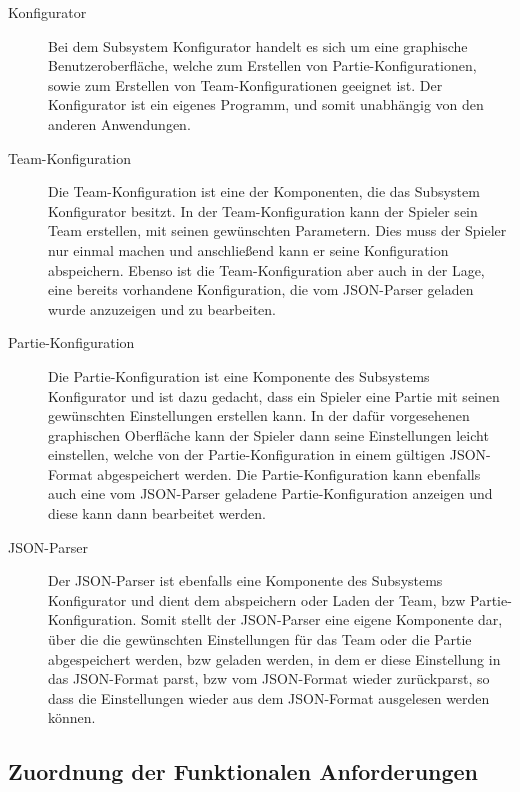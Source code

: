 \begin{description}

\item[Konfigurator]

Bei dem Subsystem Konfigurator handelt es sich um eine graphische Benutzeroberfläche, welche zum Erstellen von Partie-Konfigurationen, sowie zum Erstellen von Team-Konfigurationen  geeignet ist. Der Konfigurator ist ein eigenes Programm, und somit unabhängig von den anderen Anwendungen.

\item[Team-Konfiguration]
Die Team-Konfiguration ist eine der Komponenten, die das Subsystem Konfigurator besitzt. In der Team-Konfiguration kann der Spieler sein Team erstellen, mit seinen gewünschten Parametern. Dies muss der Spieler nur einmal machen und anschließend kann er seine Konfiguration abspeichern. Ebenso ist die Team-Konfiguration aber auch in der Lage, eine bereits vorhandene Konfiguration, die vom JSON-Parser geladen wurde anzuzeigen und zu bearbeiten.

\item[Partie-Konfiguration]
Die Partie-Konfiguration ist eine Komponente des Subsystems Konfigurator und ist dazu gedacht, dass ein Spieler eine Partie mit seinen gewünschten Einstellungen erstellen kann. In der dafür vorgesehenen graphischen Oberfläche kann der Spieler dann seine Einstellungen leicht einstellen, welche von der Partie-Konfiguration in einem gültigen JSON-Format abgespeichert werden. Die Partie-Konfiguration kann ebenfalls auch eine vom JSON-Parser geladene Partie-Konfiguration anzeigen und diese kann dann bearbeitet werden.	

\item[JSON-Parser]
Der JSON-Parser ist ebenfalls eine Komponente des Subsystems Konfigurator und dient dem abspeichern oder Laden der Team, bzw Partie-Konfiguration. Somit stellt der JSON-Parser eine eigene Komponente dar, über die die gewünschten Einstellungen für das Team oder die Partie abgespeichert werden, bzw geladen werden, in dem er diese Einstellung in das JSON-Format parst, bzw vom JSON-Format wieder zurückparst, so dass die Einstellungen wieder aus dem JSON-Format ausgelesen werden können.

\end{description}

\subsection{Zuordnung der Funktionalen Anforderungen}

